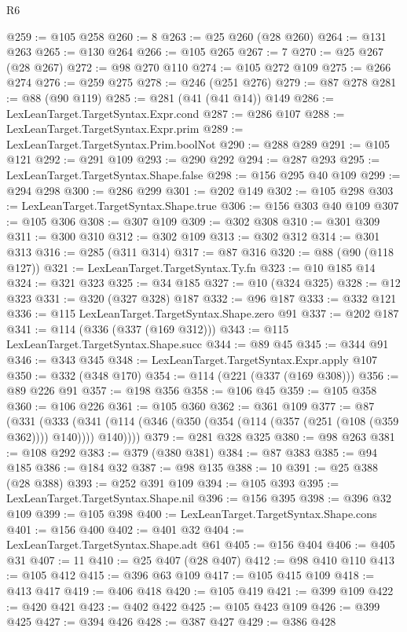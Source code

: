\begin{lexlean}{R6}
\begin{coremodule}
@259 := @105 @258
@260 := 8
@263 := @25 @260 (@28 @260)
@264 := @131 @263
@265 := @130 @264
@266 := @105 @265
@267 := 7
@270 := @25 @267 (@28 @267)
@272 := @98 @270 @110
@274 := @105 @272 @109
@275 := @266 @274
@276 := @259 @275
@278 := @246 (@251 @276)
@279 := @87 @278
@281 := @88 (@90 @119)
@285 := @281 (@41 (@41 @14)) @149
@286 := LexLeanTarget.TargetSyntax.Expr.cond
@287 := @286 @107
@288 := LexLeanTarget.TargetSyntax.Expr.prim
@289 := LexLeanTarget.TargetSyntax.Prim.boolNot
@290 := @288 @289
@291 := @105 @121
@292 := @291 @109
@293 := @290 @292
@294 := @287 @293
@295 := LexLeanTarget.TargetSyntax.Shape.false
@298 := @156 @295 @40 @109
@299 := @294 @298
@300 := @286 @299
@301 := @202 @149
@302 := @105 @298
@303 := LexLeanTarget.TargetSyntax.Shape.true
@306 := @156 @303 @40 @109
@307 := @105 @306
@308 := @307 @109
@309 := @302 @308
@310 := @301 @309
@311 := @300 @310
@312 := @302 @109
@313 := @302 @312
@314 := @301 @313
@316 := @285 (@311 @314)
@317 := @87 @316
@320 := @88 (@90 (@118 @127))
@321 := LexLeanTarget.TargetSyntax.Ty.fn
@323 := @10 @185 @14
@324 := @321 @323
@325 := @34 @185
@327 := @10 (@324 @325)
@328 := @12 @323
@331 := @320 (@327 @328) @187
@332 := @96 @187
@333 := @332 @121
@336 := @115 LexLeanTarget.TargetSyntax.Shape.zero @91
@337 := @202 @187
@341 := @114 (@336 (@337 (@169 @312)))
@343 := @115 LexLeanTarget.TargetSyntax.Shape.succ
@344 := @89 @45
@345 := @344 @91
@346 := @343 @345
@348 := LexLeanTarget.TargetSyntax.Expr.apply @107
@350 := @332 (@348 @170)
@354 := @114 (@221 (@337 (@169 @308)))
@356 := @89 @226 @91
@357 := @198 @356
@358 := @106 @45
@359 := @105 @358
@360 := @106 @226
@361 := @105 @360
@362 := @361 @109
@377 := @87
    (@331
      (@333 (@341 (@114 (@346 (@350 (@354 (@114 (@357 (@251 (@108 (@359 @362)))) @140)))) @140))))
@379 := @281 @328 @325
@380 := @98 @263
@381 := @108 @292
@383 := @379 (@380 @381)
@384 := @87 @383
@385 := @94 @185
@386 := @184 @32
@387 := @98 @135
@388 := 10
@391 := @25 @388 (@28 @388)
@393 := @252 @391 @109
@394 := @105 @393
@395 := LexLeanTarget.TargetSyntax.Shape.nil
@396 := @156 @395
@398 := @396 @32 @109
@399 := @105 @398
@400 := LexLeanTarget.TargetSyntax.Shape.cons
@401 := @156 @400
@402 := @401 @32
@404 := LexLeanTarget.TargetSyntax.Shape.adt @61
@405 := @156 @404
@406 := @405 @31
@407 := 11
@410 := @25 @407 (@28 @407)
@412 := @98 @410 @110
@413 := @105 @412
@415 := @396 @63 @109
@417 := @105 @415 @109
@418 := @413 @417
@419 := @406 @418
@420 := @105 @419
@421 := @399 @109
@422 := @420 @421
@423 := @402 @422
@425 := @105 @423 @109
@426 := @399 @425
@427 := @394 @426
@428 := @387 @427
@429 := @386 @428

\end{coremodule}
\end{lexlean}
